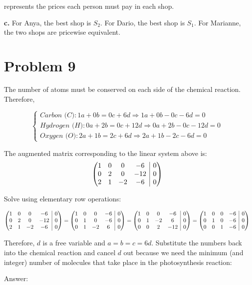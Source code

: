 \documentclass{article}
\makeatletter
\newenvironment{amatrix}[1]{\left(\begin{array}{@{}*{#1}{c}|c@{}}}{\end{array}\right)}
\makeatother
\begin{document}
represents the prices each person must pay in each shop.

\textbf{c.} For Anya, the best shop is $S_{2}$. For Dario, the best shop is $S_{1}$. For Marianne, the two shops are pricewise equivalent.

\section{Problem 9}

The number of atoms must be conserved on each side of the chemical reaction. Therefore,

\begin{equation*}
  \begin{cases}
    \textit{Carbon (C)}:   1a + 0b = 0c + 6d  \Rightarrow 1a + 0b - 0c - 6d = 0 \\
    \textit{Hydrogen (H)}: 0a + 2b = 0c + 12d \Rightarrow 0a + 2b - 0c - 12d = 0 \\
    \textit{Oxygen (O)}:   2a + 1b = 2c + 6d \Rightarrow  2a + 1b - 2c - 6d = 0
  \end{cases}
\end{equation*}

The augmented matrix corresponding to the linear system above is:
\begin{equation*}
  \begin{amatrix}{4}
    1 & 0 & 0 & -6 & 0\\
    0 & 2 & 0 & -12 & 0\\
    2 & 1 & -2 & -6 & 0
  \end{amatrix}
\end{equation*}

Solve using elementary row operations:

\begin{equation*}
  \begin{amatrix}{4}
    1 & 0 & 0 & -6 & 0\\
    0 & 2 & 0 & -12 & 0\\
    2 & 1 & -2 & -6 & 0
  \end{amatrix} =
  \begin{amatrix}{4}
    1 & 0 & 0 & -6 & 0\\
    0 & 1 & 0 & -6 & 0\\
    0 & 1 & -2 & 6 & 0
  \end{amatrix} =
   \begin{amatrix}{4}
     1 & 0 & 0 & -6 & 0\\
     0 & 1 & -2 & 6 & 0 \\
     0 & 0 & 2 & -12 & 0
   \end{amatrix} =
   \begin{amatrix}{4}
     1 & 0 & 0 & -6 & 0\\
     0 & 1 & 0 & -6 & 0 \\
     0 & 0 & 1 & -6 & 0
   \end{amatrix}
\end{equation*}

Therefore, $d$ is a free variable and $a = b = c = 6d$. Substitute the numbers back into the chemical reaction and cancel $d$ out because we need the minimum (and integer) number of molecules that take place in the photosynthesis reaction:

Answer: 
\end{document}

